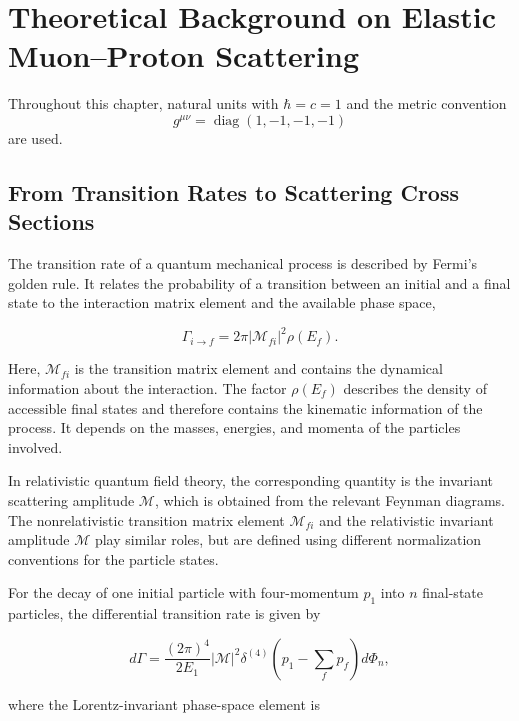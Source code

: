 \chapter{Theoretical Background on Elastic Muon--Proton Scattering}
\label{chap:Theory}
\acresetall

Throughout this chapter, natural units with \(\hbar=c=1\) and the metric convention
\[
g^{\mu\nu}=\operatorname{diag}(1,-1,-1,-1)
\]
are used.

\section{From Transition Rates to Scattering Cross Sections}

The transition rate of a quantum mechanical process is described by Fermi's golden rule. It relates the probability of a transition between an initial and a final state to the interaction matrix element and the available phase space,

\begin{equation}
    \Gamma_{i\rightarrow f}
    =
    2\pi
    \left|\mathcal{M}_{fi}\right|^2
    \rho(E_f).
\end{equation}

Here, \(\mathcal{M}_{fi}\) is the transition matrix element and contains the dynamical information about the interaction. The factor \(\rho(E_f)\) describes the density of accessible final states and therefore contains the kinematic information of the process. It depends on the masses, energies, and momenta of the particles involved.

In relativistic quantum field theory, the corresponding quantity is the invariant scattering amplitude \(\mathcal{M}\), which is obtained from the relevant Feynman diagrams. The nonrelativistic transition matrix element \(\mathcal{M}_{fi}\) and the relativistic invariant amplitude \(\mathcal{M}\) play similar roles, but are defined using different normalization conventions for the particle states.

For the decay of one initial particle with four-momentum \(p_1\) into \(n\) final-state particles, the differential transition rate is given by

\begin{equation}
    d\Gamma
    =
    \frac{(2\pi)^4}{2E_1}
    |\mathcal{M}|^2
    \delta^{(4)}
    \left(
        p_1-\sum_f p_f
    \right)
    d\Phi_n ,
\end{equation}

where the Lorentz-invariant phase-space element is

